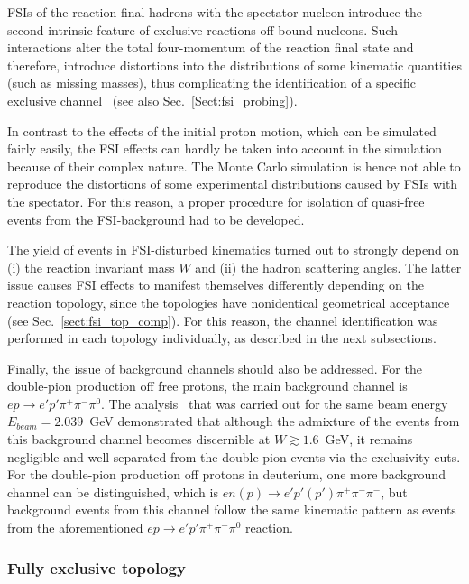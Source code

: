 \documentclass[prc,twocolumn,superscriptaddress,showpacs,amssymb,amsmath,amsfonts,aps,nofootinbib]{revtex4-1}
\begin{document}
FSIs of the reaction final hadrons with the spectator nucleon introduce the second intrinsic feature of exclusive reactions off bound nucleons. Such interactions alter the total four-momentum of the reaction final state and therefore, introduce distortions into the distributions of some kinematic quantities (such as missing masses), thus complicating the identification of a specific exclusive channel~\cite{note_mm_distr} (see also Sec.\!~\ref{Sect:fsi_probing}).






In contrast to the effects of the initial proton motion, which can be simulated fairly easily, the FSI effects can hardly be taken into account in the simulation because of their complex nature. The Monte Carlo simulation is hence not able to reproduce the distortions of some experimental distributions caused by FSIs with the spectator. For this reason, a proper procedure for isolation of quasi-free events from the FSI-background had to be developed.


The yield of events in FSI-disturbed kinematics turned out to strongly depend on (i) the reaction invariant mass $W$ and (ii) the hadron scattering angles. The latter issue causes FSI effects to manifest themselves differently depending on the reaction topology, since the topologies have nonidentical geometrical acceptance (see Sec.\!~\ref{sect:fsi_top_comp}). For this reason, the channel identification was performed in each topology individually, as described in the next subsections. 


Finally, the issue of background channels should also be addressed. For the double-pion production off free protons, the main background channel is $ep\rightarrow e'p'\pi^{+}\pi^{-}\pi^{0}$. The analysis~\cite{Fed_an_note:2017,Fed_paper_2018} that was carried out for the same beam energy $E_{beam} = 2.039$~GeV demonstrated that although the admixture of the events from this background channel becomes discernible at $W\gtrsim 1.6$~GeV, it remains negligible and well separated from the double-pion events via the exclusivity cuts. For the double-pion production off protons in deuterium, one more background channel can be distinguished, which is $en(p) \rightarrow e'p'(p')\pi^{+}\pi^{-}\pi^{-}$, but background events from this channel follow the same kinematic pattern as events from the aforementioned $ep\rightarrow e'p'\pi^{+}\pi^{-}\pi^{0}$ reaction.




\subsubsection{Fully exclusive topology}
\label{Sect:excl_cut_fully_excl}
\end{document}

